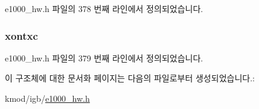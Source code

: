 e1000\+\_\+hw.\+h 파일의 378 번째 라인에서 정의되었습니다.

\subsubsection[{\texorpdfstring{xontxc}{xontxc}}]{ xontxc}\hypertarget{structe1000__hw__stats_ac3b35c3807688713e21c725177a023d5}{}\label{structe1000__hw__stats_ac3b35c3807688713e21c725177a023d5}


e1000\+\_\+hw.\+h 파일의 379 번째 라인에서 정의되었습니다.



이 구조체에 대한 문서화 페이지는 다음의 파일로부터 생성되었습니다.\+:\begin{DoxyCompactItemize}
\item 
kmod/igb/\hyperlink{kmod_2igb_2e1000__hw_8h}{e1000\+\_\+hw.\+h}\end{DoxyCompactItemize}
